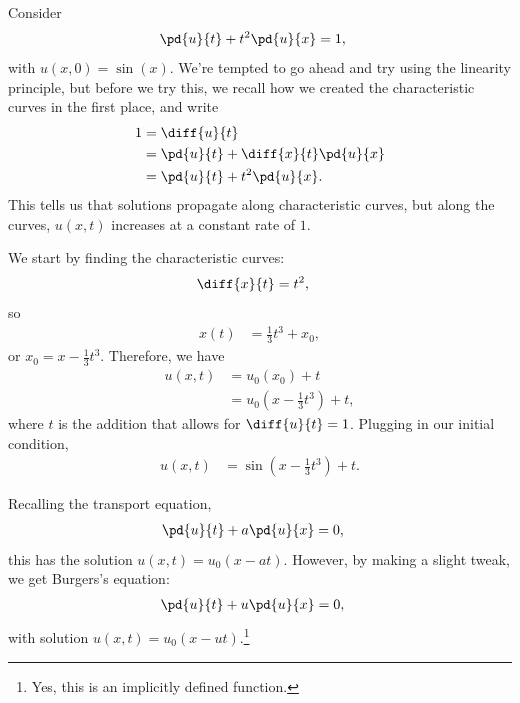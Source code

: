 \documentclass[10pt]{mypackage}
\begin{document}
\begin{example}
  Consider
  \begin{align*}
    \pd{u}{t} + t^2\pd{u}{x} &= 1,
  \end{align*}
  with $u\left( x,0 \right) = \sin(x)$. We're tempted to go ahead and try using the linearity principle, but before we try this, we recall how we created the characteristic curves in the first place, and write
  \begin{align*}
    1 &= \diff{u}{t}\\
      &= \pd{u}{t} + \diff{x}{t} \pd{u}{x}\\
      &= \pd{u}{t} + t^2\pd{u}{x}.
  \end{align*}
  This tells us that solutions propagate along characteristic curves, but along the curves, $u\left( x,t \right)$ increases at a constant rate of $1$.\newline

  We start by finding the characteristic curves:
  \begin{align*}
    \diff{x}{t}  &= t^2,
  \end{align*}
  so
  \begin{align*}
    x(t) &= \frac{1}{3}t^3 + x_0,
  \end{align*}
  or $x_0 = x - \frac{1}{3}t^3$. Therefore, we have
  \begin{align*}
    u\left( x,t \right) &= u_0\left( x_0 \right) + t\\
    &= u_0\left( x-\frac{1}{3}t^3 \right) + t,
  \end{align*}
  where $t$ is the addition that allows for $\diff{u}{t} = 1$. Plugging in our initial condition,
  \begin{align*}
    u\left( x,t \right) &= \sin\left( x - \frac{1}{3}t^3 \right) + t.
  \end{align*}
\end{example}
Recalling the transport equation,
\begin{align*}
  \pd{u}{t} + a \pd{u}{x} &= 0,
\end{align*}
this has the solution $u\left( x,t \right) = u_0\left( x-at \right)$. However, by making a slight tweak, we get Burgers's equation:
\begin{align*}
  \pd{u}{t} + u \pd{u}{x} &= 0,
\end{align*}
with solution $u\left( x,t \right) = u_0\left( x-ut \right)$.\footnote{Yes, this is an implicitly defined function.}
\end{document}
